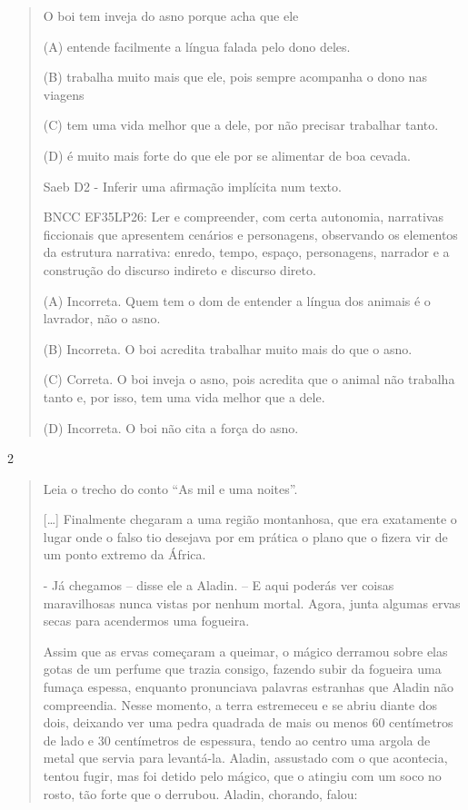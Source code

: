 \begin{escolha}
\begin{escolha}
{\begin{quote}
O boi tem inveja do asno porque acha que ele

(A) entende facilmente a língua falada pelo dono deles.

(B) trabalha muito mais que ele, pois sempre acompanha o dono nas
viagens

(C) tem uma vida melhor que a dele, por não precisar trabalhar tanto.

(D) é muito mais forte do que ele por se alimentar de boa cevada.

Saeb D2 - Inferir uma afirmação implícita num texto.

BNCC EF35LP26: Ler e compreender, com certa autonomia, narrativas
ficcionais que apresentem cenários e personagens, observando os
elementos da estrutura narrativa: enredo, tempo, espaço, personagens,
narrador e a construção do discurso indireto e discurso direto.

(A) Incorreta. Quem tem o dom de entender a língua dos animais é o
lavrador, não o asno.

(B) Incorreta. O boi acredita trabalhar muito mais do que o asno.

(C) Correta. O boi inveja o asno, pois acredita que o animal não
trabalha tanto e, por isso, tem uma vida melhor que a dele.

(D) Incorreta. O boi não cita a força do asno.
\end{quote}

\num{2}

\begin{quote}
Leia o trecho do conto ``As mil e uma noites''.

{[}\ldots{}{]} Finalmente chegaram a uma região montanhosa, que era
exatamente o lugar onde o falso tio desejava por em prática o plano que
o fizera vir de um ponto extremo da África.

- Já chegamos -- disse ele a Aladin. -- E aqui poderás ver coisas
maravilhosas nunca vistas por nenhum mortal. Agora, junta algumas ervas
secas para acendermos uma fogueira.

Assim que as ervas começaram a queimar, o mágico derramou sobre elas
gotas de um perfume que trazia consigo, fazendo subir da fogueira uma
fumaça espessa, enquanto pronunciava palavras estranhas que Aladin não
compreendia. Nesse momento, a terra estremeceu e se abriu diante dos
dois, deixando ver uma pedra quadrada de mais ou menos 60 centímetros de
lado e 30 centímetros de espessura, tendo ao centro uma argola de metal
que servia para levantá-la. Aladin, assustado com o que acontecia,
tentou fugir, mas foi detido pelo mágico, que o atingiu com um soco no
rosto, tão forte que o derrubou. Aladin, chorando, falou:


\end{quote}}
\end{escolha}
\end{escolha}
